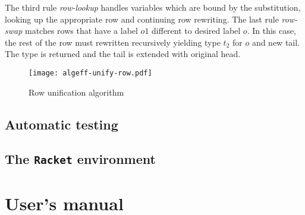 \documentclass[inz, english, shortabstract]{iithesis}
\newcommand{\Racket}{\texttt{Racket}}
\begin{document}
The third rule \emph{row-lookup} handles variables which are bound by the substitution, looking up the appropriate row and continuing row rewriting.
The last rule \emph{row-swap} matches rows that have a label $o1$ different to desired label $o$.
In this case, the rest of the row must rewritten recursively yielding type $t_2$ for $o$ and new tail.
The type is returned and the tail is extended with original head.

\begin{figure}
  \centering
  \texttt{[image: algeff-unify-row.pdf]}
  \caption{Row unification algorithm}
  \label{fig:algeff-unify-row}
\end{figure}

\section{Automatic testing}

\section{The \Racket{} environment}

\chapter{User's manual}\label{ch:manual}

\printbibliography

\end{document}
